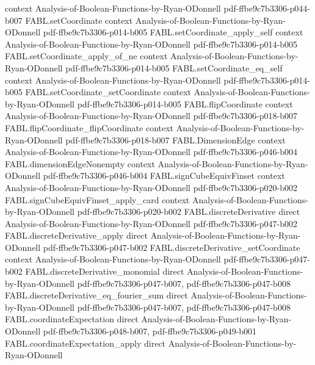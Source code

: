 \begin{theorem}
  {context}
  {Analysis-of-Boolean-Functions-by-Ryan-ODonnell}
  {pdf-ffbe9c7b3306-p044-b007}
\proofstep
  {FABL.setCoordinate}
  {context}
  {Analysis-of-Boolean-Functions-by-Ryan-ODonnell}
  {pdf-ffbe9c7b3306-p014-b005}
\proofstep
  {FABL.setCoordinate_apply_self}
  {context}
  {Analysis-of-Boolean-Functions-by-Ryan-ODonnell}
  {pdf-ffbe9c7b3306-p014-b005}
\proofstep
  {FABL.setCoordinate_apply_of_ne}
  {context}
  {Analysis-of-Boolean-Functions-by-Ryan-ODonnell}
  {pdf-ffbe9c7b3306-p014-b005}
\proofstep
  {FABL.setCoordinate_eq_self}
  {context}
  {Analysis-of-Boolean-Functions-by-Ryan-ODonnell}
  {pdf-ffbe9c7b3306-p014-b005}
\proofstep
  {FABL.setCoordinate_setCoordinate}
  {context}
  {Analysis-of-Boolean-Functions-by-Ryan-ODonnell}
  {pdf-ffbe9c7b3306-p014-b005}
\proofstep
  {FABL.flipCoordinate}
  {context}
  {Analysis-of-Boolean-Functions-by-Ryan-ODonnell}
  {pdf-ffbe9c7b3306-p018-b007}
\proofstep
  {FABL.flipCoordinate_flipCoordinate}
  {context}
  {Analysis-of-Boolean-Functions-by-Ryan-ODonnell}
  {pdf-ffbe9c7b3306-p018-b007}
\proofstep
  {FABL.DimensionEdge}
  {context}
  {Analysis-of-Boolean-Functions-by-Ryan-ODonnell}
  {pdf-ffbe9c7b3306-p046-b004}
\proofstep
  {FABL.dimensionEdgeNonempty}
  {context}
  {Analysis-of-Boolean-Functions-by-Ryan-ODonnell}
  {pdf-ffbe9c7b3306-p046-b004}
\proofstep
  {FABL.signCubeEquivFinset}
  {context}
  {Analysis-of-Boolean-Functions-by-Ryan-ODonnell}
  {pdf-ffbe9c7b3306-p020-b002}
\proofstep
  {FABL.signCubeEquivFinset_apply_card}
  {context}
  {Analysis-of-Boolean-Functions-by-Ryan-ODonnell}
  {pdf-ffbe9c7b3306-p020-b002}
\proofstep
  {FABL.discreteDerivative}
  {direct}
  {Analysis-of-Boolean-Functions-by-Ryan-ODonnell}
  {pdf-ffbe9c7b3306-p047-b002}
\proofstep
  {FABL.discreteDerivative_apply}
  {direct}
  {Analysis-of-Boolean-Functions-by-Ryan-ODonnell}
  {pdf-ffbe9c7b3306-p047-b002}
\proofstep
  {FABL.discreteDerivative_setCoordinate}
  {context}
  {Analysis-of-Boolean-Functions-by-Ryan-ODonnell}
  {pdf-ffbe9c7b3306-p047-b002}
\proofstep
  {FABL.discreteDerivative_monomial}
  {direct}
  {Analysis-of-Boolean-Functions-by-Ryan-ODonnell}
  {pdf-ffbe9c7b3306-p047-b007,
    pdf-ffbe9c7b3306-p047-b008}
\proofstep
  {FABL.discreteDerivative_eq_fourier_sum}
  {direct}
  {Analysis-of-Boolean-Functions-by-Ryan-ODonnell}
  {pdf-ffbe9c7b3306-p047-b007,
    pdf-ffbe9c7b3306-p047-b008}
\proofstep
  {FABL.coordinateExpectation}
  {direct}
  {Analysis-of-Boolean-Functions-by-Ryan-ODonnell}
  {pdf-ffbe9c7b3306-p048-b007,
    pdf-ffbe9c7b3306-p049-b001}
\proofstep
  {FABL.coordinateExpectation_apply}
  {direct}
  {Analysis-of-Boolean-Functions-by-Ryan-ODonnell}

\end{theorem}
